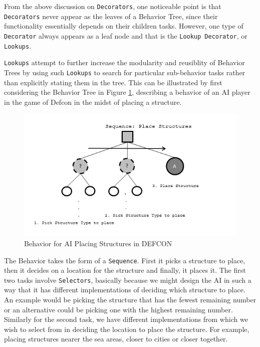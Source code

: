             From the above discussion on \texttt{Decorators}, one noticeable point is that \texttt{Decorators} never appear as the leaves of a Behavior Tree, since their functionality essentially depends on their children tasks. However, one type of \texttt{Decorator} always appears as a leaf node and that is the \texttt{Lookup Decorator}, or \texttt{Lookups}. 
            
            \texttt{Lookups} attempt to further increase the modularity and reusiblity of Behavior Trees by using such \texttt{Lookups} to search for particular sub-behavior tasks rather than explicitly stating them in the tree. This can be illustrated by first considering the Behavior Tree in Figure \ref{img:lookup1}, describing a behavior of an AI player in the game of Defcon in the midst of placing a structure.
            
            \begin{figure}[h]
                
                \begin{center}
                \includegraphics[scale=0.6]{images/lookup1.png}
                \caption{Behavior for AI Placing Structures in DEFCON}
                \label{img:lookup1}
                \end{center}            
            \end{figure}
         
            
            The Behavior takes the form of a \texttt{Sequence}. First it picks a structure to place, then it decides on a location for the structure and finally, it places it. The first two tasks involve \texttt{Selectors}, basically because we might design the AI in such a way that it has different implementations of deciding which structure to place. An example would be picking the structure that has the fewest remaining number or an alternative could be picking one with the highest remaining number. Similarly for the second task, we have different implementations from which we wish to select from in deciding the location to place the structure. For example, placing structures nearer the sea areas, closer to cities or closer together.
            
